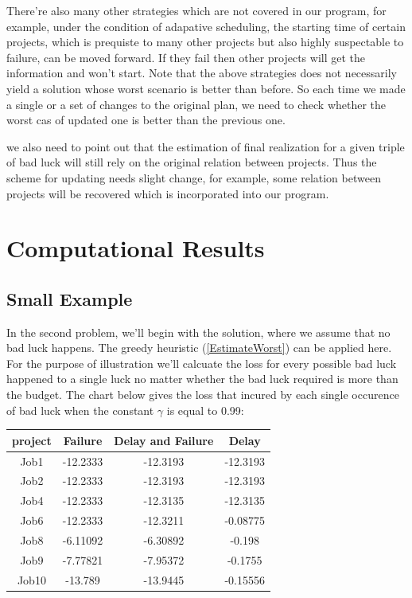 \documentclass[final,3p,times]{elsarticle}
\begin{document}
There're also many other strategies which are not  covered in our program, for example, under the condition of adapative scheduling, the starting time of certain projects, which is prequiste to many other projects but also highly suspectable to failure, can be moved forward. If they fail then other projects will get the information and won't start. Note that the above strategies does not necessarily yield a solution whose worst scenario is better than before. So each time we made a single or a set of changes to the original plan, we need to check whether the worst cas of updated one is better than the previous one.  

we also need to point out that the estimation of final realization for a given triple of bad luck will still rely on the original relation between projects. Thus the scheme for updating needs slight change, for example, some relation between projects will be recovered which is incorporated into our program.

\section{Computational Results}
\subsection{Small Example}
In the second problem, we'll begin with the solution, where we assume that no bad luck happens. The greedy  heuristic (\ref{EstimateWorst}) can be applied here. For the purpose of illustration we'll calcuate the loss for every possible bad luck happened to a single luck no matter whether the bad luck required is more than the budget. The chart below gives the loss that incured by each single occurence of bad luck when the constant $\gamma$ is equal to 0.99:

\begin{tabular}{|c|c|c|c|}
	\hline
	project & Failure & Delay and Failure & Delay \\
	\hline
	Job1 & -12.2333 & -12.3193 & -12.3193 \\
	\hline
	Job2 & -12.2333 & -12.3193 & -12.3193 \\
	\hline
	Job4 & -12.2333 & -12.3135 & -12.3135 \\
	\hline
	Job6 & -12.2333 & -12.3211 & -0.08775 \\
	\hline
	Job8 & -6.11092 & -6.30892 & -0.198 \\
	\hline
	Job9 & -7.77821 & -7.95372 & -0.1755 \\
	\hline
	Job10 & -13.789 & -13.9445 & -0.15556 \\
	\hline
\end{tabular}
\end{document}
